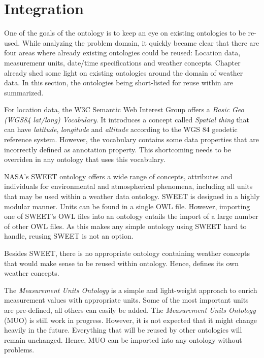 \section{Integration}

One of the goals of the \thinkhomeweather ontology is to keep an eye on existing ontologies to be re-used. While analyzing the problem domain, it quickly became clear that there are four areas where already existing ontologies could be reused: Location data, measuremenr units, date/time specifications and weather concepts. Chapter \label{ch:existing_work} already shed some light on existing ontologies around the domain of weather data. In this section, the ontologies being short-listed for reuse within \thinkhomeweather are summarized.

For location data, the W3C Semantic Web Interest Group offers a \emph{Basic Geo (WGS84 lat/long) Vocabulary}. It introduces a concept called \emph{Spatial thing} that can have \emph{latitude}, \emph{longitude} and \emph{altitude} according to the WGS 84 geodetic reference system. However, the vocabulary contains some data properties that are incorrectly defined as annotation property. This shortcoming needs to be overriden in any ontology that uses this vocabulary.

NASA's SWEET ontology offers a wide range of concepts, attributes and individuals for environmental and atmospherical phenomena, including all units that may be used within a weather data ontology. SWEET is designed in a highly modular manner. Units can be found in a single OWL file. However, importing one of SWEET's OWL files into an ontology entails the import of a large number of other OWL files. As this makes any simple ontology using SWEET hard to handle, reusing SWEET is not an option.

Besides SWEET, there is no appropriate ontology containing weather concepts that would make sense to be reused within \thinkhomeweather ontology. Hence, \thinkhomeweather defines its own weather concepts.

The \emph{Measurement Units Ontology} is a simple and light-weight approach to enrich measurement values with appropriate units. Some of the most important units are pre-defined, all others can easily be added. The \emph{Measurement Units Ontology} (MUO) is still work in progress. However, it is not expected that it might change heavily in the future. Everything that will be reused by other ontologies will remain unchanged. Hence, MUO can be imported into any ontology without problems.

